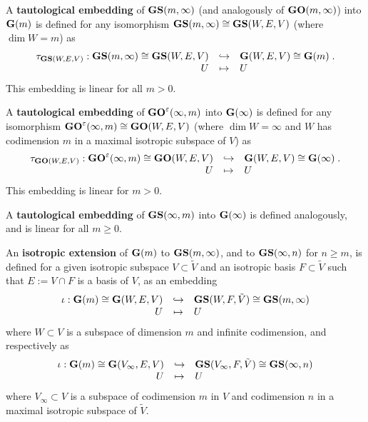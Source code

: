 \documentclass[12pt]{amsart}
\def\eps {\varepsilon}
\begin{document}
A {\bf tautological embedding} of ${\bf GS}(m,\infty)$ (and analogously of ${\bf GO}(m,\infty)$) into ${\bf G}(m)$ is defined for any isomorphism ${\bf GS}(m,\infty)\cong {\bf GS}(W,E,V)$ (where $\dim W=m$) as
\begin{gather*}
\begin{array}{rcl}
\tau_{{\bf GS}(W,E,V)}:{\bf GS}(m,\infty)\cong {\bf GS}(W,E,V) & \hookrightarrow & {\bf G}(W,E,V) \cong {\bf G}(m) \;.\\ 
U & \mapsto  & U
\end{array}
\end{gather*}
This embedding is linear for all $m>0$.

A {\bf tautological embedding} of ${\bf GO}^\eps(\infty,m)$ into ${\bf G}(\infty)$ is defined for any isomorphism ${\bf GO}^\eps(\infty,m)\cong {\bf GO}(W,E,V)$ (where $\dim W=\infty$ and $W$ has codimension $m$ in a maximal isotropic subspace of $V$) as
\begin{gather*}
\begin{array}{rcl}
\tau_{{\bf GO}(W,E,V)}:{\bf GO}^\eps(\infty,m)\cong {\bf GO}(W,E,V) & \hookrightarrow & {\bf G}(W,E,V) \cong {\bf G}(\infty) \;.\\ 
U & \mapsto  & U
\end{array}
\end{gather*}
This embedding is linear for $m>0$.

A {\bf tautological embedding} of ${\bf GS}(\infty,m)$ into ${\bf G}(\infty)$ is defined analogously, and is linear for all $m\geq0$.

An {\bf isotropic extension} of ${\bf G}(m)$ to ${\bf GS}(m,\infty)$, and to ${\bf GS}(\infty,n)$ for $n\geq m$, is defined for a given isotropic subspace $V\subset \tilde V$ and an isotropic basis $F\subset \tilde V$ such that $E:=V\cap F$ is a basis of $V$, as an embedding
\begin{gather*}
\begin{array}{rcl}
\iota:{\bf G}(m)\cong {\bf G}(W,E, V) & \hookrightarrow & {\bf GS}(W,F, \tilde V) \cong {\bf GS}(m,\infty) \\ 
U & \mapsto  & U
\end{array}
\end{gather*}
where $W\subset V$ is a subspace of dimension $m$ and infinite codimension, and respectively as
\begin{gather*}
\begin{array}{rcl}
\iota:{\bf G}(m)\cong {\bf G}(V_\infty,E, V) & \hookrightarrow & {\bf GS}(V_\infty,F, \tilde V) \cong {\bf GS}(\infty,n) \\ 
U & \mapsto  & U
\end{array}
\end{gather*}
where $V_\infty\subset V$ is a subspace of codimension $m$ in $V$ and codimension $n$ in a maximal isotropic subspace of $\tilde V$.
\end{document}
